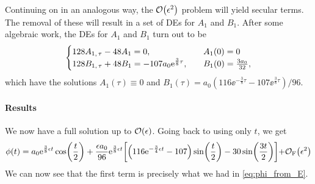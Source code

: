 \documentclass[10pt,letter, swedish, english,%
]{article}
\begin{document}
Continuing on in an analogous way, the $\order{\epsilon^2}$ problem
will yield secular terms. The removal of these will result in a set of
DEs for $A_1$ and $B_1$. 
After some algebraic work, the DEs for $A_1$ and $B_1$ turn out to be
\begin{equation}
\begin{cases}
128A_{1,\,\tau}-48A_1=0\qcomma&A_1(0)=0\\
128B_{1,\,\tau}+48B_1=-107a_0\ee^{\frac{3}{8}\tau}\qcomma&B_1(0)=\frac{3a_0}{32},
\end{cases}
\end{equation}
which have the solutions $A_1(\tau)\equiv0$ and
$B_1(\tau)=a_0(116\ee^{-\frac{3}{8}\tau}-107\ee^{\frac{3}{8}\tau})/96$.


\paragraph{Results}
We now have a full solution up to $\order{\epsilon}$.
Going back to using only $t$, we get
\begin{equation}
\phi(t)=a_0\mathrm{e}^{\frac{3}{8}\epsilon{t}}\cos(\frac{t}{2})
+\frac{\epsilon a_0}{96}\mathrm{e}^{\frac{3}{8}\epsilon{t}}\qty[
\qty(116\mathrm{e}^{-\frac{3}{4}\epsilon{t}}-107)
\sin(\frac{t}{2})
-30\sin(\frac{3t}{2})]
{+}\mathcal{O}_\text{F}\qty(\epsilon^2)
\end{equation}
We can now see that the first term is precisely what we had in
\eqref{eq:phi_from_E}. 
\end{document}
